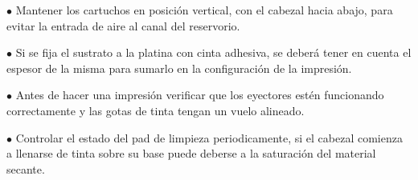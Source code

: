 $\bullet$ Mantener los cartuchos en posición vertical, con el cabezal hacia abajo, para evitar la entrada de aire al canal del reservorio.

$\bullet$ Si se fija el sustrato a la platina con cinta adhesiva, se deberá tener en cuenta el espesor de la misma para sumarlo en la configuración de la impresión.

$\bullet$ Antes de hacer una impresión verificar que los eyectores estén funcionando correctamente y las gotas de tinta tengan un vuelo alineado.

$\bullet$ Controlar el estado del pad de limpieza periodicamente, si el cabezal comienza a llenarse de tinta sobre su base puede deberse a la saturación del material secante.

